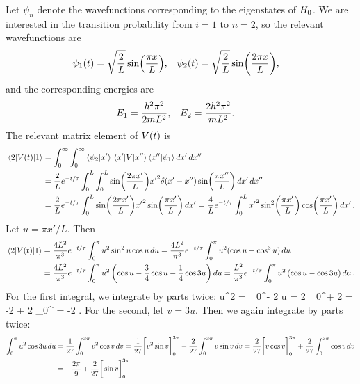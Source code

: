 \begin{solution}
	Let $\psi_n$ denote the wavefunctions corresponding to the eigenstates of $H_0$.  We are interested in the transition probability from $i = 1$ to $n = 2$, so the relevant wavefunctions are
	\begin{align*}
		\psi_1(t) &= \sqrt{\frac{2}{L}} \sin(\frac{\pi x}{L}), &
		\psi_2(t) &= \sqrt{\frac{2}{L}} \sin(\frac{2\pi x}{L}),
	\end{align*}
	and the corresponding energies are
	\begin{align*}
		E_1 &= \frac{\hbar^2 \pi^2}{2 m L^2}, &
		E_2 &= \frac{2 \hbar^2 \pi^2}{m L^2}.
	\end{align*}
	The relevant matrix element of $V(t)$ is
	\begin{align*}
		\mel{2}{V(t)}{1} &= \int_0^\infty \int_0^\infty \braket{\psi_2}{x'} \mel{x'}{V}{x''} \braket{x''}{\psi_1} \dd{x'} \dd{x''} \\
		&= \frac{2}{L} e^{-t / \tau} \int_0^L \int_0^L \sin(\frac{2\pi x'}{L}) {x'}^2 \delta(x' - x'') \sin(\frac{\pi x''}{L}) \dd{x'} \dd{x''} \\
		&= \frac{2}{L} e^{-t / \tau} \int_0^L \sin(\frac{2\pi x'}{L}) {x'}^2 \sin(\frac{\pi x'}{L}) \dd{x'}
		= \frac{4}{L} e^{-t / \tau} \int_0^L {x'}^2 \sin[2](\frac{\pi x'}{L}) \cos(\frac{\pi x'}{L}) \dd{x'}.
	\end{align*}
	Let $u = \pi x' / L$.  Then
	\begin{align*}
		\mel{2}{V(t)}{1} &= \frac{4 L^2}{\pi^3} e^{-t / \tau} \int_0^\pi u^2 \sin^2{u} \cos{u} \dd{u}
		= \frac{4 L^2}{\pi^3} e^{-t / \tau} \int_0^\pi u^2 (\cos{u} - \cos^3{u}) \dd{u} \\
		&= \frac{4 L^2}{\pi^3} e^{-t / \tau} \int_0^\pi u^2 \left( \cos{u} - \frac{3}{4} \cos{u} - \frac{1}{4} \cos{3u} \right) \dd{u}
		= \frac{L^2}{\pi^3} e^{-t / \tau} \int_0^\pi u^2 \left( \cos{u} - \cos{3u} \right) \dd{u}.
	\end{align*}
	For the first integral, we integrate by parts twice:
	\beq
		\intopi u^2  \du = _0^\pi - 2 \intopi u  \du
		= 2 _0^\pi + 2 \intopi {} \du
		= -2 \pi + 2 _0^\pi
		= -2 \pi.
	\eeq
	For the second, let $v = 3u$.  Then we again integrate by parts twice:
	\begin{align*}
		\intopi u^2 \cos{3u} \du &= \frac{1}{27} \intoepi v^2 \cos{v} \ddv
		= \frac{1}{27} \bigg[ v^2 \sin{v} \bigg]_0^{3\pi} - \frac{2}{27} \intoepi v \sin{v} \ddv
		= \frac{2}{27} \bigg[ v \cos{v} \bigg]_0^{3\pi} + \frac{2}{27} \intoepi \cos{v} \ddv \\
		&= -\frac{2\pi}{9} + \frac{2}{27} \bigg[ \sin{v} \bigg]_0^{3\pi}

\end{align*}
\end{solution}
